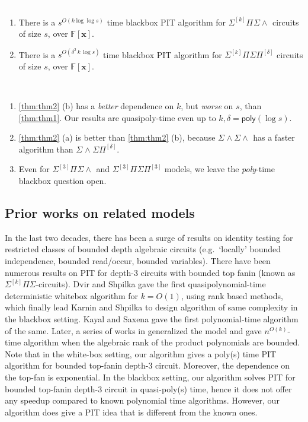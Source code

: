 \documentclass[10pt,a4paper]{article}
\newcommand{\poly}{\mathsf{poly}}
\newcommand{\F}{\mathbb{F}}
\newcommand{\x}{{\boldsymbol x}}
\newcommand{\SPSP}[3]{\Sigma^{#1}\Pi^{#2}\Sigma\Pi^{#3}}
\newcommand{\SWSP}[3]{\Sigma^{#1}\!\wedge^{#2}\!\Sigma\Pi^{#3}}
\newcommand{\SPSU}[3]{\Sigma^{#1} \Pi^{#2} \Sigma \wedge^{#3}}
\newcommand{\SWSU}[2]{\Sigma^{#1}\!\wedge\!\Sigma\!\wedge^{#2}}
\numberwithin{equation}{section}
\begin{document}
\begin{theorem}\label{thm:thm2}
    \textcolor{white}{.}
    \begin{enumerate}[label={(\alph*)}]
        \item There is a $s^{O(k \log \log s)}$ time blackbox PIT algorithm for $\SPSU{[k]}{}{}$ circuits of size $s$, over $\F[\x]$.
        \item There is a $s^{O(\delta^2\,k\,\log s)}$ time blackbox PIT algorithm for $\SPSP{[k]}{}{[\delta]}$ circuits of size $s$, over $\F[\x]$.
    \end{enumerate}
\end{theorem}

\begin{remark*} ~ 
    \begin{enumerate}
    \setlength\itemsep{.1em}
        \item \autoref{thm:thm2} (b) has a \emph{better} dependence on $k$, but \emph{worse} on $s$, than \autoref{thm:thm1}. Our results are quasipoly-time even up to $k,\delta = \poly(\log s)$.
        \item \autoref{thm:thm2} (a) is better than \autoref{thm:thm2} (b), because $\SWSU{}{}{}$ has a faster algorithm than $\SWSP{}{}{[\delta]}$. 
%
        \item Even for $\SPSU{[3]}{}{}$ and $\SPSP{[3]}{}{[3]}$ models, we leave the {\em poly}-time blackbox question open. 
    \end{enumerate}
\end{remark*}

\subsection{Prior works on related models}  

In the last two decades, there has been a surge of results on identity testing for restricted
classes of bounded depth algebraic circuits (e.g.~`locally' bounded independence, bounded read/occur, bounded variables). There have been numerous results on PIT for depth-3 circuits with bounded
top fanin (known as $\Sigma^{[k]}\Pi\Sigma$-circuits). Dvir and Shpilka \cite{dvir2007locally} gave the first quasipolynomial-time deterministic whitebox algorithm for $k=O(1)$, using rank based methods, which finally lead Karnin and Shpilka \cite{karnin2011black} to design algorithm of same complexity in the blackbox setting. Kayal and Saxena \cite{kayal2007polynomial} gave the first polynomial-time algorithm of the same. Later, a series of works 
in \cite{saxena2011almost,saxena2012blackbox,saxena2013sylvester, agrawal2016jacobian} generalized the model and gave $n^{O(k)}$-time algorithm when the algebraic rank of the product polynomials are bounded. Note that in the white-box setting, our algorithm gives a poly(s) time PIT algorithm for bounded top-fanin depth-3 circuit. Moreover, the dependence on the top-fan is exponential. In the blackbox setting, our algorithm solves PIT for bounded top-fanin depth-3 circuit in quasi-poly(s) time, hence it does not offer any speedup compared to known polynomial time algorithms. However, our algorithm does give a PIT idea that is different from the known ones.
\end{document}
